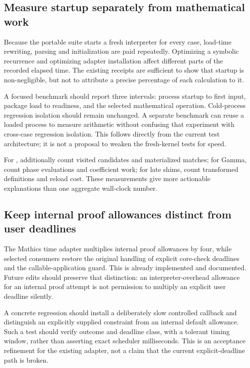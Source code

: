 \documentclass[11pt,letterpaper]{article}
\newcommand{\code}[1]{\texttt{\detokenize{#1}}}
\begin{document}
\subsection{Measure startup separately from mathematical work}
Because the portable suite starts a fresh interpreter for every case, load-time rewriting, parsing and initialization are paid repeatedly. Optimizing a symbolic recurrence and optimizing adapter installation affect different parts of the recorded elapsed time. The existing receipts are sufficient to show that startup is non-negligible, but not to attribute a precise percentage of each calculation to it.

A focused benchmark should report three intervals: process startup to first input, package load to readiness, and the selected mathematical operation. Cold-process regression isolation should remain unchanged. A separate benchmark can reuse a loaded process to measure arithmetic without confusing that experiment with cross-case regression isolation. This follows directly from the current test architecture; it is not a proposal to weaken the fresh-kernel tests for speed.

For \code{FirstPosition}, additionally count visited candidates and materialized matches; for Gamma, count phase evaluations and coefficient work; for late shims, count transformed definitions and reload cost. These measurements give more actionable explanations than one aggregate wall-clock number.

\subsection{Keep internal proof allowances distinct from user deadlines}
The Mathics time adapter multiplies internal proof allowances by four, while selected consumers restore the original handling of explicit core-check deadlines and the callable-application guard. This is already implemented and documented. Future edits should preserve that distinction: an interpreter-overhead allowance for an internal proof attempt is not permission to multiply an explicit user deadline silently.\cite{mathicstime,mathicscore}

A concrete regression should install a deliberately slow controlled callback and distinguish an explicitly supplied constraint from an internal default allowance. Such a test should verify outcome and deadline class, with a tolerant timing window, rather than asserting exact scheduler milliseconds. This is an acceptance refinement for the existing adapter, not a claim that the current explicit-deadline path is broken.
\end{document}
